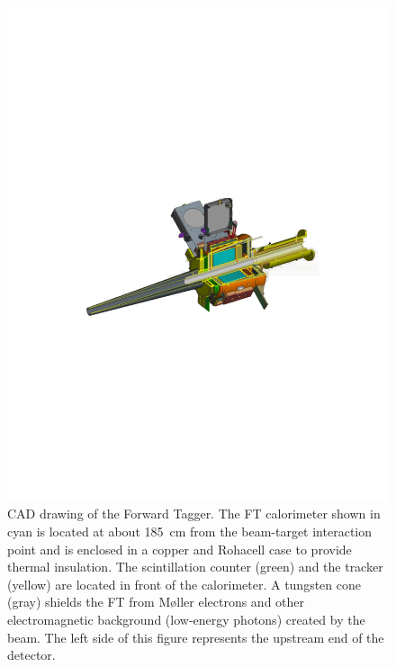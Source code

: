 \begin{figure}[th!]
\centering 
\includegraphics[width=\textwidth]{./fig/ft-model.pdf} 
\caption{CAD drawing of the Forward Tagger. The FT calorimeter shown in cyan is located at about 185~cm from
  the beam-target interaction point and is enclosed in a copper and Rohacell case to provide thermal insulation. The
  scintillation counter (green) and the tracker (yellow) are located in front of the calorimeter. A tungsten cone
  (gray) shields the FT from M{\o}ller electrons and other electromagnetic background (low-energy photons)
  created by the beam. The left side of this figure represents the upstream end of the detector.} 
\label{fig:ftcad} 
\end{figure}

